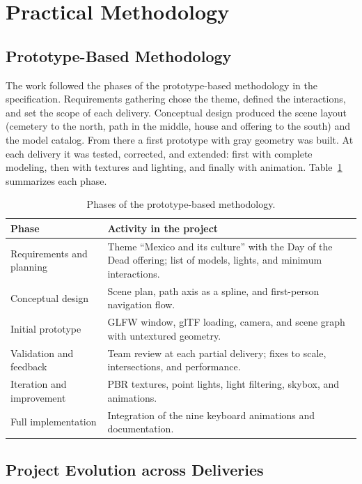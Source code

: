 \documentclass[letter,12pt]{article}
\begin{document}
	\section{Practical Methodology}

	\subsection{Prototype-Based Methodology}
	The work followed the phases of the prototype-based methodology in the specification. Requirements gathering chose the theme, defined the interactions, and set the scope of each delivery. Conceptual design produced the scene layout (cemetery to the north, path in the middle, house and offering to the south) and the model catalog. From there a first prototype with gray geometry was built. At each delivery it was tested, corrected, and extended: first with complete modeling, then with textures and lighting, and finally with animation. Table~\ref{tab:phases} summarizes each phase.

	\begin{table}[H]
		\centering
		\small
		\begin{tabularx}{\textwidth}{p{4.2cm}X}
			\toprule
			\textbf{Phase} & \textbf{Activity in the project}\\
			\midrule
			Requirements and planning & Theme ``Mexico and its culture'' with the Day of the Dead offering; list of models, lights, and minimum interactions. \\
			Conceptual design & Scene plan, path axis as a spline, and first-person navigation flow. \\
			Initial prototype & GLFW window, glTF loading, camera, and scene graph with untextured geometry. \\
			Validation and feedback & Team review at each partial delivery; fixes to scale, intersections, and performance. \\
			Iteration and improvement & PBR textures, point lights, light filtering, skybox, and animations. \\
			Full implementation & Integration of the nine keyboard animations and documentation. \\
			\bottomrule
		\end{tabularx}
		\caption{Phases of the prototype-based methodology.}
		\label{tab:phases}
	\end{table}

	\subsection{Project Evolution across Deliveries}
\end{document}
